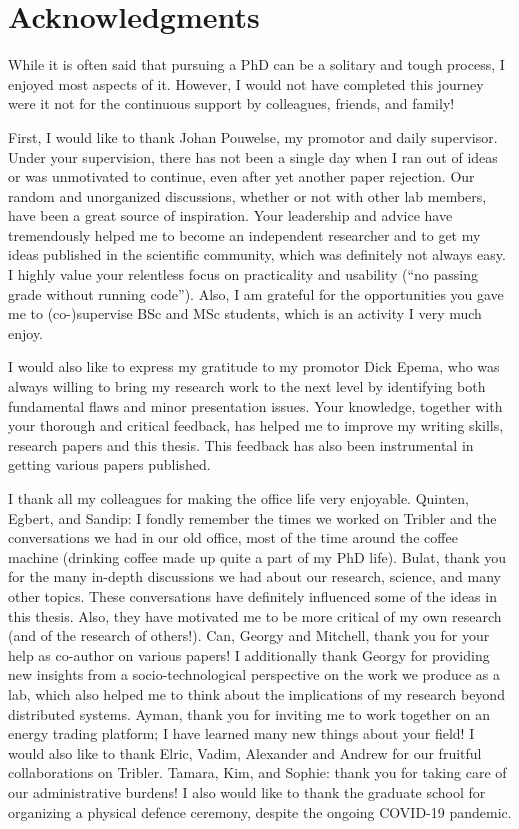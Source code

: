 \chapter*{Acknowledgments}

While it is often said that pursuing a PhD can be a solitary and tough process, I enjoyed most aspects of it.
However, I would not have completed this journey were it not for the continuous support by colleagues, friends, and family!

First, I would like to thank Johan Pouwelse, my promotor and daily supervisor.
Under your supervision, there has not been a single day when I ran out of ideas or was unmotivated to continue, even after yet another paper rejection.
Our random and unorganized discussions, whether or not with other lab members, have been a great source of inspiration.
Your leadership and advice have tremendously helped me to become an independent researcher and to get my ideas published in the scientific community, which was definitely not always easy.
I highly value your relentless focus on practicality and usability (\enquote{no passing grade without running code}).
Also, I am grateful for the opportunities you gave me to (co-)supervise BSc and MSc students, which is an activity I very much enjoy.

I would also like to express my gratitude to my promotor Dick Epema, who was always willing to bring my research work to the next level by identifying both fundamental flaws and minor presentation issues.
Your knowledge, together with your thorough and critical feedback, has helped me to improve my writing skills, research papers and this thesis.
This feedback has also been instrumental in getting various papers published.

I thank all my colleagues for making the office life very enjoyable.
Quinten, Egbert, and Sandip: I fondly remember the times we worked on Tribler and the conversations we had in our old office, most of the time around the coffee machine (drinking coffee made up quite a part of my PhD life\emojicoffee{}).
Bulat, thank you for the many in-depth discussions we had about our research, science, and many other topics.
These conversations have definitely influenced some of the ideas in this thesis. Also, they have motivated me to be more critical of my own research (and of the research of others!).
Can, Georgy and Mitchell, thank you for your help as co-author on various papers!
I additionally thank Georgy for providing new insights from a socio-technological perspective on the work we produce as a lab, which also helped me to think about the implications of my research beyond distributed systems.
Ayman, thank you for inviting me to work together on an energy trading platform; I have learned many new things about your field!
I would also like to thank Elric, Vadim, Alexander and Andrew for our fruitful collaborations on Tribler.
Tamara, Kim, and Sophie: thank you for taking care of our administrative burdens!
I also would like to thank the graduate school for organizing a physical defence ceremony, despite the ongoing COVID-19 pandemic.

